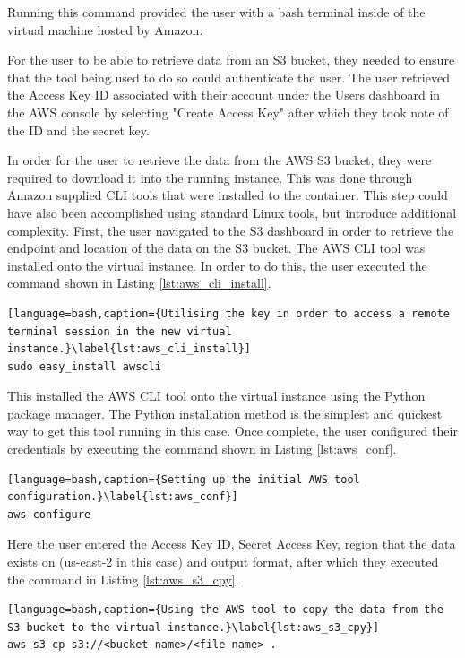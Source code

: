 Running this command provided the user with a bash terminal inside of the virtual machine hosted by Amazon.

For the user to be able to retrieve data from an S3 bucket, they needed to ensure that the tool being used to do so could authenticate the user. The user retrieved the Access Key ID associated with their account under the Users dashboard in the AWS console by selecting "Create Access Key" after which they took note of the ID and the secret key.

In order for the user to retrieve the data from the AWS S3 bucket, they were required to download it into the running instance. This was done through Amazon supplied CLI tools that were installed to the container. This step could have also been accomplished using standard Linux tools, but introduce additional complexity. First, the user navigated to the S3 dashboard in order to retrieve the endpoint and location of the data on the S3 bucket. The AWS CLI tool was installed onto the virtual instance. In order to do this, the user executed the command shown in Listing \ref{lst:aws_cli_install}.

\begin{lstlisting}[language=bash,caption={Utilising the key in order to access a remote terminal session in the new virtual instance.}\label{lst:aws_cli_install}]
sudo easy_install awscli
\end{lstlisting}

This installed the AWS CLI tool onto the virtual instance using the Python package manager. The Python installation method is the simplest and quickest way to get this tool running in this case. Once complete, the user configured their credentials by executing the command shown in Listing \ref{lst:aws_conf}.

\begin{lstlisting}[language=bash,caption={Setting up the initial AWS tool configuration.}\label{lst:aws_conf}]
aws configure
\end{lstlisting}

Here the user entered the Access Key ID, Secret Access Key, region that the data exists on (us-east-2 in this case) and output format, after which they executed the command in Listing \ref{lst:aws_s3_cpy}.

\begin{lstlisting}[language=bash,caption={Using the AWS tool to copy the data from the S3 bucket to the virtual instance.}\label{lst:aws_s3_cpy}]
aws s3 cp s3://<bucket name>/<file name> .
\end{lstlisting}

